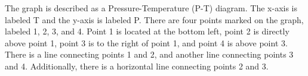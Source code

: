 The graph is described as a Pressure-Temperature (P-T) diagram. The x-axis is labeled T and the y-axis is labeled P. There are four points marked on the graph, labeled 1, 2, 3, and 4. Point 1 is located at the bottom left, point 2 is directly above point 1, point 3 is to the right of point 1, and point 4 is above point 3. There is a line connecting points 1 and 2, and another line connecting points 3 and 4. Additionally, there is a horizontal line connecting points 2 and 3.